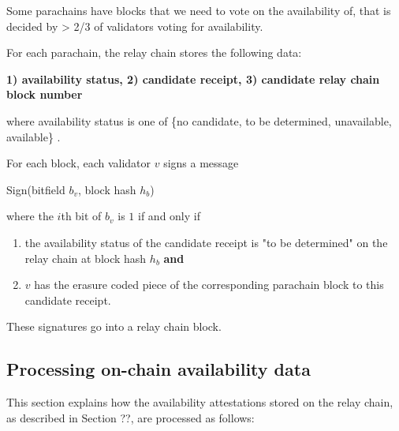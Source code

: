 Some parachains have blocks that we need to vote on the availability of, that is decided by > 2/3 of validators voting for availability. 
\newline

For each parachain, the relay chain stores the following data: %

\textbf{1) availability status, 2) candidate receipt, 3) candidate relay chain block number}

where availability status is one of \{no candidate, to be determined, unavailable, available\} .

For each block, each validator $v$ signs a message

Sign(bitfield $b_v$, block hash $h_b$)

where the $i$th bit of $b_v$ is $1$ if and only if

\begin{enumerate}
\item the availability status of the candidate receipt is "to be determined" on the relay chain at block hash $h_b$ \textbf{and}

\item $v$ has the erasure coded piece of the corresponding parachain block to this candidate receipt.
\end{enumerate}

These signatures go into a relay chain block.

\subsection{Processing on-chain availability data}
This section explains how the availability attestations stored on the relay chain, as described in Section ??, are processed as follows:

